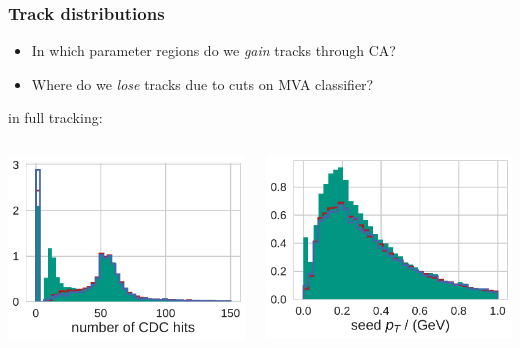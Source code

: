 \documentclass[18pt, aspectratio=169]{beamer}
\begin{document}
\begin{frame}
  \frametitle{Track distributions}

  \begin{itemize}
  \item In which parameter regions do we \emph{gain} tracks through CA?
  \item Where do we \emph{lose} tracks due to cuts on MVA classifier?
  \end{itemize}
  
  in full tracking:
  \begin{columns}
    \begin{column}{.5\textwidth}
      \centering
      \includegraphics[width=.7\textwidth]{figures/rejected_vs_other_track_distributions_by_found_n_cdc_hits_normed=False_scaleByEvents=True_fullreco_trainedWithFakes.pdf}
      
    \end{column}
    \begin{column}{.5\textwidth}
      \centering
      \includegraphics[width=.7\textwidth]{figures/rejected_vs_other_track_distributions_by_found_pt_normed=False_scaleByEvents=True_fullreco_trainedWithFakes.pdf}


\end{column}
\end{columns}
\end{frame}
\end{document}
